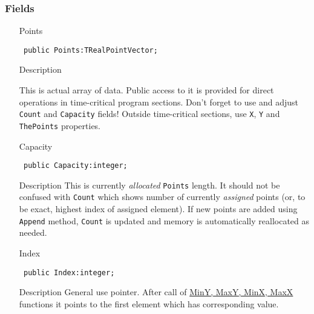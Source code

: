 \documentclass[12pt,a4paper,oneside]{report}
\newcommand{\descriptiontitle}[1]{{\addfontfeatures{FakeSlant}#1}}
\newcommand{\inlineitem}[1]{{\addfontfeatures{FakeBold} #1}}
\newcommand{\code}[1]{\texttt{#1}}
\begin{document}
\subsubsection{Fields}
\begin{itemize}
	\label{lmPointsVec.TPoints-Points}
	\item[\inlineitem{Points}\hfill]
	\begin{flushleft}
		\code{
			public Points:TRealPointVector;}
	\end{flushleft}
\item[\descriptiontitle{Description}]

This is actual array of data. Public access to it is provided for direct operations in time-critical program sections. Don't forget to use and adjust \code{Count} and \code{Capacity} fields! Outside time-critical sections, use \code{X}, \code{Y} and \code{ThePoints} properties.
	
\par  \label{lmPointsVec.TPoints-Capacity}
	\item[\inlineitem{Capacity}\hfill]
	\begin{flushleft}
		\code{
			public Capacity:integer;}
	\end{flushleft}
	\item[\descriptiontitle{Description}]	
	This is currently \emph{allocated} \code{Points} length. It should not be confused with \code{Count} which shows number of currently \emph{assigned} points (or, to be exact, highest index of assigned element). If new points are added using \code{Append} method, \code{Count} is updated and memory is automatically reallocated as needed.
	  
	\par  \label{lmPointsVec.TPoints-Index}
	\item[\inlineitem{Index}\hfill]
	\begin{flushleft}
		\code{
			public Index:integer;}
	\end{flushleft}
	\item[\descriptiontitle{Description}]	
	General use pointer. After call of \hyperref[lmPointsVec.TPoints-MinX]{MinY, MaxY, MinX, MaxX} functions it points to the first element which has corresponding value.
	\par  \end{itemize}
	\par  \label{lmPointsVec.TPoints-Count}
\end{document}
